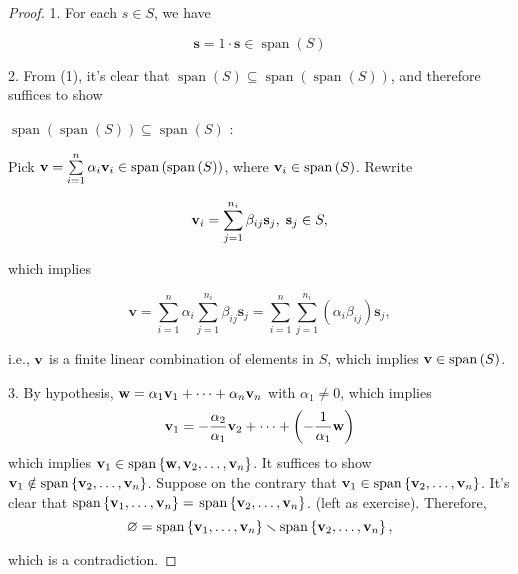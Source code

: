 \documentclass[11pt]{article}
\begin{document}
\begin{proof} 
1. For each \(s \in  S\), we have

\[
\mathbf{s} = 1 \cdot  \mathbf{s} \in  \operatorname{span}\left( S\right)
\]

2. From (1), it’s clear that \(\operatorname{span}\left( S\right)  \subseteq  \operatorname{span}\left( {\operatorname{span}\left( S\right) }\right)\), and therefore suffices to show

\(\operatorname{span}\left( {\operatorname{span}\left( S\right) }\right)  \subseteq  \operatorname{span}\left( S\right)\) :

Pick \(\mathbf{v} = \mathop{\sum }\limits_{{i = 1}}^n\alpha_{i}{\bf v}_{i} \in  \operatorname{span}\left( {\operatorname{span}\left( S\right) }\right)\), where \({\bf v}_{i} \in  \operatorname{span}\left( S\right)\). Rewrite

\[
{\bf v}_{i} = \mathop{\sum }\limits_{{j = 1}}^{n_{i}}\beta_{ij}{\mathbf{s}}_{j},\;{\mathbf{s}}_{j} \in  S,
\]

which implies

\[
\mathbf{v} = \mathop{\sum }\limits_{{i = 1}}^n\alpha_{i}\mathop{\sum }\limits_{{j = 1}}^{n_{i}}\beta_{ij}{\mathbf{s}}_{j} = \mathop{\sum }\limits_{{i = 1}}^n\mathop{\sum }\limits_{{j = 1}}^{n_{i}}\left( {\alpha_{i}\beta_{ij}}\right) {\mathbf{s}}_{j},
\]

i.e., \(\bf v\) is a finite linear combination of elements in \(S\), which implies \({\bf v} \in  \operatorname{span}\left( S\right)\).

3. By hypothesis, \(\mathbf{w} = \alpha_1{\bf v}_1 + \cdots  + \alpha_n{\bf v}_n\) with \(\alpha_1 \neq  0\), which implies
\[
{\bf v}_1 =  - \frac{\alpha_2}{\alpha_1}{\bf v}_2 + \cdots  + \left( {-\frac1{\alpha_1}\mathbf{w}}\right)
\]
which implies \({\bf v}_1 \in  \operatorname{span}\left\{  {\mathbf{w},{\bf v}_2,\ldots ,{\bf v}_n}\right\}\). It suffices to show \({\bf v}_1 \notin  \operatorname{span}\left\{  {{\bf v}_2,\ldots ,{\bf v}_n}\right\}\). Suppose on the contrary that \({\bf v}_1 \in  \operatorname{span}\left\{  {{\bf v}_2,\ldots ,{\bf v}_n}\right\}\). It’s clear that \(\operatorname{span}\left\{  {{\bf v}_1,\ldots ,{\bf v}_n}\right\}   =\)  \(\operatorname{span}\left\{  {{\bf v}_2,\ldots ,{\bf v}_n}\right\}\). (left as exercise). Therefore,
\[
\varnothing  = \operatorname{span}\left\{  {{\bf v}_1,\ldots ,{\bf v}_n}\right\}   \smallsetminus  \operatorname{span}\left\{  {{\bf v}_2,\ldots ,{\bf v}_n}\right\}  ,
\]

which is a contradiction.
\end{proof}
\end{document}
